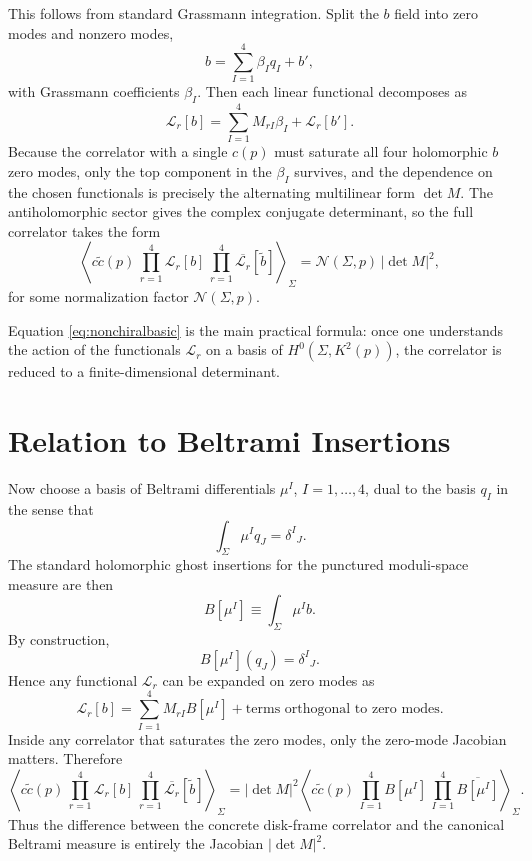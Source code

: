 \documentclass[12pt]{article}
\newcommand{\cL}{\mathcal{L}}
\newcommand{\cN}{\mathcal{N}}
\newcommand{\wt}[1]{\widetilde{#1}}
\newcommand{\ol}[1]{\overline{#1}}
\begin{document}
This follows from standard Grassmann integration. Split the $b$ field into zero modes and nonzero modes,
\begin{equation}
b = \sum_{I=1}^4 \beta_I q_I + b',
\end{equation}
with Grassmann coefficients $\beta_I$. Then each linear functional decomposes as
\begin{equation}
\cL_r[b]=\sum_{I=1}^4 M_{rI}\beta_I + \cL_r[b'].
\end{equation}
Because the correlator with a single $c(p)$ must saturate all four holomorphic $b$ zero modes, only the top component in the $\beta_I$ survives, and the dependence on the chosen functionals is precisely the alternating multilinear form $\det M$. The antiholomorphic sector gives the complex conjugate determinant, so the full correlator takes the form
\begin{equation}
\left\langle c\wt{c}(p)\,\prod_{r=1}^4 \cL_r[b] \, \prod_{r=1}^4 \ol{\cL_r}[\wt{b}]\right\rangle_{\Sigma}
= \cN(\Sigma,p)\,|\det M|^2,
\label{eq:nonchiralbasic}
\end{equation}
for some normalization factor $\cN(\Sigma,p)$.

Equation \eqref{eq:nonchiralbasic} is the main practical formula: once one understands the action of the functionals $\cL_r$ on a basis of $H^0(\Sigma,K^2(p))$, the correlator is reduced to a finite-dimensional determinant.

\section{Relation to Beltrami Insertions}

Now choose a basis of Beltrami differentials $\mu^I$, $I=1,\dots,4$, dual to the basis $q_I$ in the sense that
\begin{equation}
\int_{\Sigma} \mu^I q_J = \delta^I{}_J.
\end{equation}
The standard holomorphic ghost insertions for the punctured moduli-space measure are then
\begin{equation}
B[\mu^I] \equiv \int_{\Sigma} \mu^I b.
\end{equation}
By construction,
\begin{equation}
B[\mu^I](q_J)=\delta^I{}_J.
\end{equation}
Hence any functional $\cL_r$ can be expanded on zero modes as
\begin{equation}
\cL_r[b] = \sum_{I=1}^4 M_{rI} B[\mu^I] + \text{terms orthogonal to zero modes}.
\end{equation}
Inside any correlator that saturates the zero modes, only the zero-mode Jacobian matters. Therefore
\begin{equation}
\left\langle c\wt{c}(p)\,\prod_{r=1}^4 \cL_r[b] \, \prod_{r=1}^4 \ol{\cL_r}[\wt{b}]\right\rangle_{\Sigma}
= |\det M|^2
\left\langle c\wt{c}(p)\,\prod_{I=1}^4 B[\mu^I] \, \prod_{I=1}^4 \ol{B[\mu^I]}\right\rangle_{\Sigma}.
\label{eq:beltramiconversion}
\end{equation}
Thus the difference between the concrete disk-frame correlator and the canonical Beltrami measure is entirely the Jacobian $|\det M|^2$.
\end{document}
